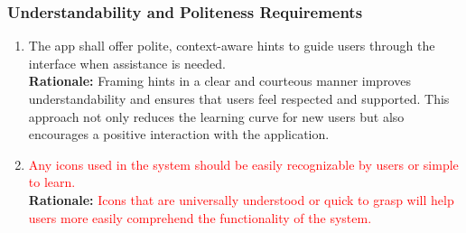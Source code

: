 \documentclass{article}
\begin{document}
\subsubsection{Understandability and Politeness Requirements}
\label{ssub:understandability_and_politeness_requirements}
\begin{enumerate}[{UH-UP}1. ]
	\item The app shall offer polite, context-aware hints to guide users through the interface when assistance is needed.\\
	\textbf{Rationale:} Framing hints in a clear and courteous manner improves understandability and ensures that users feel respected and supported. This approach not only reduces the learning curve for new users but also encourages a positive interaction with the application.
	\item \textcolor {red}{Any icons used in the system should be easily recognizable by users or simple to learn.}\\
	\textbf{Rationale:} \textcolor {red}{Icons that are universally understood or quick to grasp will help users more easily comprehend the functionality of the system.}
\end{enumerate}
\end{document}
